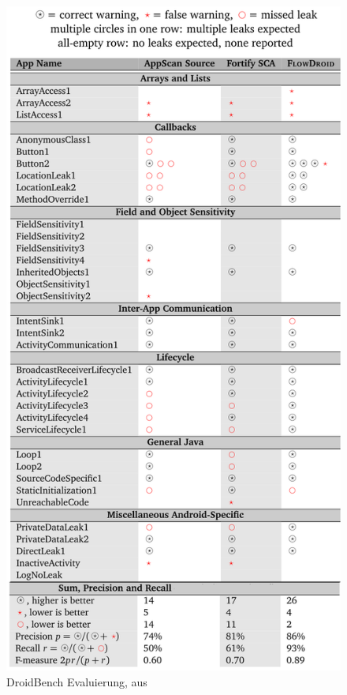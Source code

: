 \documentclass[runningheads]{llncs}
\begin{document}
\begin{figure}[htp]
\centering 
\includegraphics[scale=1]{img/evaluation.png}
\caption{DroidBench Evaluierung, aus \cite{technical}}
\label{fig:eval}
\end{figure} 
 
\end{document}
